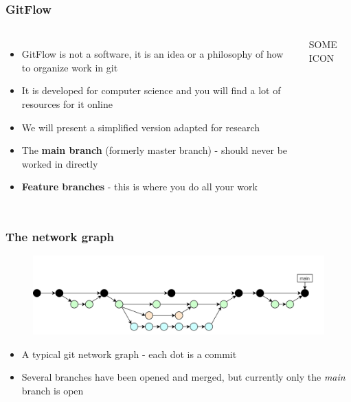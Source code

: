 \documentclass[aspectratio=169]{beamer} %
\begin{document}
\begin{frame}
	\frametitle{GitFlow}
	\begin{columns}[c]

		\begin{itemize}
			\setlength\itemsep{.5em}
			\item GitFlow is not a software, it is an idea or a philosophy of how to organize work in git
			\item It is developed for computer science and you will find a lot of resources for it online
			\item We will present a simplified version adapted for research
			\item The \textbf{main branch} (formerly master branch) - should never be worked in directly
			\item \textbf{Feature branches} - this is where you do all your work
		\end{itemize}

		\vspace{-.75cm}
		\Large SOME ICON
	\end{columns}
\end{frame}

\begin{frame}
	\frametitle{The network graph}

	\vspace{-.5cm}
	\begin{minipage}[t][5cm][t]{\textwidth}
		\begin{figure}
			\centering
			\includegraphics[width=\textwidth]{./img/dime-gitflow-network.png}
		\end{figure}
	\end{minipage}

	\vspace{-.5cm}
	\begin{minipage}[t][5cm][t]{\textwidth}
		\begin{itemize}
			\setlength\itemsep{.5em}
			\item A typical git network graph - each dot is a commit
			\item Several branches have been opened and merged, but currently only the \textit{main} branch is open
		\end{itemize}
	\end{minipage}

\end{frame}
\end{document}
